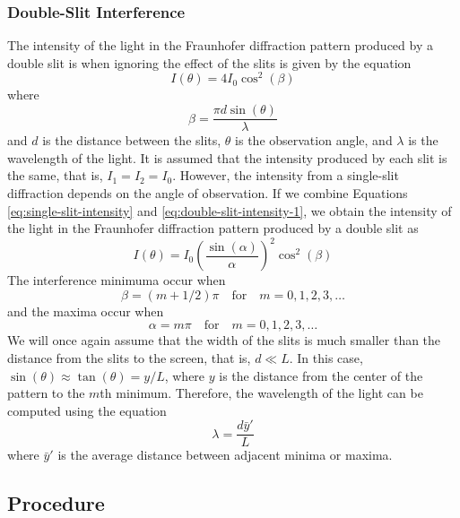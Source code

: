 \documentclass[10pt]{article}
\begin{document}
\subsubsection*{Double-Slit Interference}

The intensity of the light in the Fraunhofer diffraction pattern produced by a double slit is when ignoring the effect of the slits is given by the equation
\begin{equation}
  I(\theta) = 4 I_0 \cos^2(\beta)
  \label{eq:double-slit-intensity-1}
\end{equation}
where
\begin{equation}
  \beta = \frac{\pi d \sin(\theta)}{\lambda}
\end{equation}
and $d$ is the distance between the slits, $\theta$ is the observation angle, and $\lambda$ is the wavelength of the light. It is assumed that the intensity produced by each slit is the same, that is, $I_1 = I_2 = I_0$. However, the intensity from a single-slit diffraction depends on the angle of observation. If we combine Equations \eqref{eq:single-slit-intensity} and \eqref{eq:double-slit-intensity-1}, we obtain the intensity of the light in the Fraunhofer diffraction pattern produced by a double slit as
\begin{equation}
  I(\theta) = I_0 \left( \frac{\sin(\alpha)}{\alpha} \right)^2 \cos^2(\beta)
  \label{eq:double-slit-intensity-2}
\end{equation}
The interference minimuma occur when
\begin{equation}
  \beta = (m + 1/2) \pi \quad \text{for} \quad m = 0, 1, 2, 3, \ldots
\end{equation}
and the maxima occur when
\begin{equation}
  \alpha = m \pi \quad \text{for} \quad m = 0, 1, 2, 3, \ldots
\end{equation}  
We will once again assume that the width of the slits is much smaller than the distance from the slits to the screen, that is, $d \ll L$. In this case, $\sin(\theta) \approx \tan(\theta) = y/L$, where $y$ is the distance from the center of the pattern to the $m$th minimum. Therefore, the wavelength of the light can be computed using the equation
\begin{equation}
  \lambda = \frac{d \bar{y}'}{L}
\end{equation}
where $\bar{y}'$ is the average distance between adjacent minima or maxima.

\subsection*{Procedure} 
\end{document}
